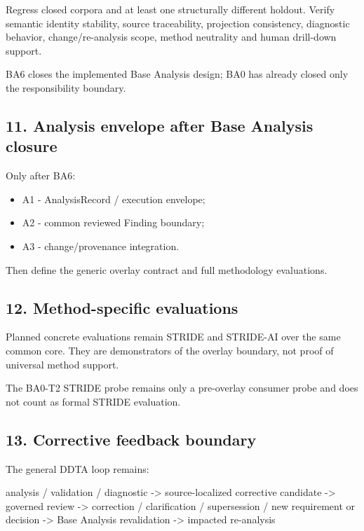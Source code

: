 \documentclass[
  10pt,
]{article}
\newenvironment{Shaded}{}{}
\newcommand{\NormalTok}[1]{#1}
\providecommand{\tightlist}{%
  \setlength{\itemsep}{0pt}\setlength{\parskip}{0pt}}
\begin{document}
Regress closed corpora and at least one structurally different holdout.
Verify semantic identity stability, source traceability, projection
consistency, diagnostic behavior, change/re-analysis scope, method
neutrality and human drill-down support.

BA6 closes the implemented Base Analysis design; BA0 has already closed
only the responsibility boundary.

\subsection{11. Analysis envelope after Base Analysis
closure}\label{analysis-envelope-after-base-analysis-closure}

Only after BA6:

\begin{itemize}
\tightlist
\item
  A1 - AnalysisRecord / execution envelope;
\item
  A2 - common reviewed Finding boundary;
\item
  A3 - change/provenance integration.
\end{itemize}

Then define the generic overlay contract and full methodology
evaluations.

\subsection{12. Method-specific
evaluations}\label{method-specific-evaluations}

Planned concrete evaluations remain STRIDE and STRIDE-AI over the same
common core. They are demonstrators of the overlay boundary, not proof
of universal method support.

The BA0-T2 STRIDE probe remains only a pre-overlay consumer probe and
does not count as formal STRIDE evaluation.

\subsection{13. Corrective feedback
boundary}\label{corrective-feedback-boundary}

The general DDTA loop remains:

\begin{Shaded}
\begin{Highlighting}[]
\NormalTok{analysis / validation / diagnostic}
\NormalTok{ {-}\textgreater{} source{-}localized corrective candidate}
\NormalTok{ {-}\textgreater{} governed review}
\NormalTok{ {-}\textgreater{} correction / clarification / supersession / new requirement or decision}
\NormalTok{ {-}\textgreater{} Base Analysis revalidation}
\NormalTok{ {-}\textgreater{} impacted re{-}analysis}
\end{Highlighting}
\end{Shaded}
\end{document}
